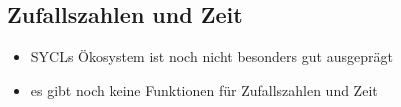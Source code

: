 \subsection{Zufallszahlen und Zeit}

\begin{itemize}
    \item SYCLs Ökosystem ist noch nicht besonders gut ausgeprägt
    \item es gibt noch keine Funktionen für Zufallszahlen und Zeit
\end{itemize}
